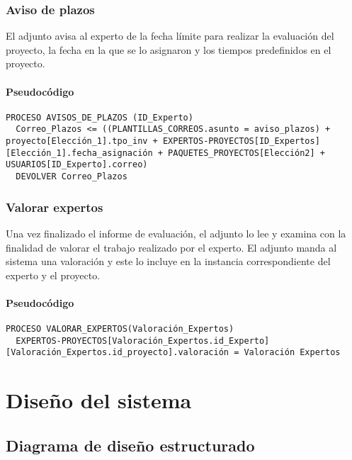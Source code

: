 \documentclass[12pt,a4paper,spanish,twoside]{book}
\begin{document}
\subsection{Aviso de plazos}
El adjunto avisa al experto de la fecha límite para realizar la evaluación del 
proyecto, la fecha en la que se lo asignaron y los tiempos predefinidos en el 
proyecto.

\subsubsection{Pseudocódigo}
\begin{lstlisting}[inputencoding=utf8/latin1]
PROCESO AVISOS_DE_PLAZOS (ID_Experto)
  Correo_Plazos <= ((PLANTILLAS_CORREOS.asunto = aviso_plazos) + proyecto[Elección_1].tpo_inv + EXPERTOS-PROYECTOS[ID_Expertos][Elección_1].fecha_asignación + PAQUETES_PROYECTOS[Elección2] + USUARIOS[ID_Experto].correo)
  DEVOLVER Correo_Plazos

\end{lstlisting}

\subsection{Valorar expertos}
Una vez finalizado el informe de evaluación, el adjunto lo lee y examina con la 
finalidad de valorar el trabajo realizado por el experto. El adjunto manda al 
sistema una valoración y este lo incluye en la instancia correspondiente del 
experto y el proyecto.

\subsubsection{Pseudocódigo}
\begin{lstlisting}[inputencoding=utf8/latin1]
PROCESO VALORAR_EXPERTOS(Valoración_Expertos)
  EXPERTOS-PROYECTOS[Valoración_Expertos.id_Experto][Valoración_Expertos.id_proyecto].valoración = Valoración Expertos

\end{lstlisting}

\chapter{Diseño del sistema}
\section{Diagrama de diseño estructurado}
\end{document}

